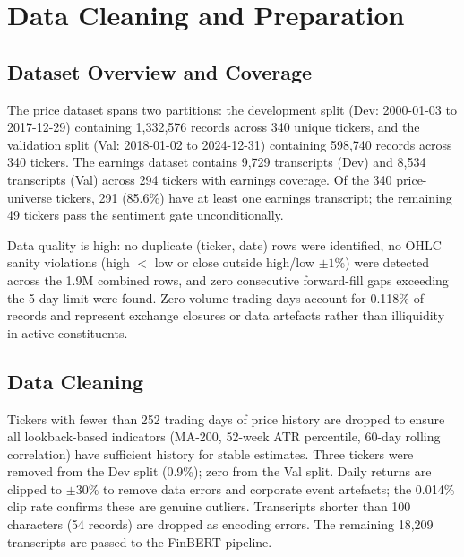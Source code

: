\documentclass[11pt,twoside,a4paper]{article}
\begin{document}

\section{Data Cleaning and Preparation}
\subsection{Dataset Overview and Coverage}

The price dataset spans two partitions: the development split (Dev: 2000-01-03 to 2017-12-29) containing 1,332,576 records across 340 unique tickers, and the validation split (Val: 2018-01-02 to 2024-12-31) containing 598,740 records across 340 tickers. The earnings dataset contains 9,729 transcripts (Dev) and 8,534 transcripts (Val) across 294 tickers with earnings coverage. Of the 340 price-universe tickers, 291 (85.6\%) have at least one earnings transcript; the remaining 49 tickers pass the sentiment gate unconditionally.

Data quality is high: no duplicate (ticker, date) rows were identified, no OHLC sanity violations (high $<$ low or close outside high/low $\pm 1\%$) were detected across the 1.9M combined rows, and zero consecutive forward-fill gaps exceeding the 5-day limit were found. Zero-volume trading days account for 0.118\% of records and represent exchange closures or data artefacts rather than illiquidity in active constituents.

\subsection{Data Cleaning}

Tickers with fewer than 252 trading days of price history are dropped to ensure all lookback-based indicators (MA-200, 52-week ATR percentile, 60-day rolling correlation) have sufficient history for stable estimates. Three tickers were removed from the Dev split (0.9\%); zero from the Val split. Daily returns are clipped to $\pm 30\%$ to remove data errors and corporate event artefacts; the 0.014\% clip rate confirms these are genuine outliers. Transcripts shorter than 100 characters (54 records) are dropped as encoding errors. The remaining 18,209 transcripts are passed to the FinBERT pipeline.


\end{document}
